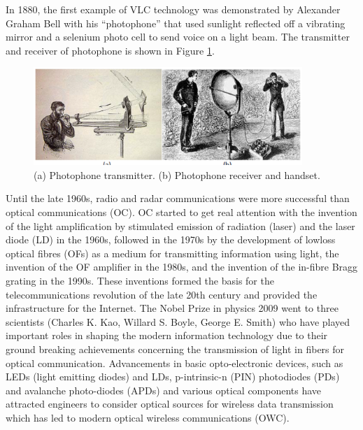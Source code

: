 In 1880, the first example of VLC technology was demonstrated by Alexander Graham Bell with his “photophone” that used sunlight
reflected off a vibrating mirror and a selenium photo cell to send voice on a light beam. The transmitter and receiver of photophone is shown in Figure \ref{sun}.
\begin{figure}[h]
\begin{center}
\includegraphics[width=4.0in]{sunlight.eps}
\caption{(a) Photophone transmitter. (b) Photophone receiver and handset.} \label{sun}
\end{center}
\end{figure}

Until the late 1960s, radio and radar communications were more successful than optical communications
(OC). OC started to get real attention with the invention of the light amplification by stimulated emission of
radiation (laser) and the laser diode (LD) in the 1960s, followed in the 1970s by the development of lowloss
optical fibres (OFs) as a medium for transmitting information using light, the invention of the OF amplifier in the 1980s, and the invention of the in-fibre Bragg grating in the 1990s. These inventions formed the basis for the telecommunications revolution of the late 20th century and provided the infrastructure for the Internet. The Nobel Prize in physics 2009 went to three scientists (Charles K. Kao, Willard S. Boyle,
George E. Smith) who have played important roles in shaping the modern information technology due to
their ground breaking achievements concerning the transmission of light in fibers for optical
communication. Advancements in basic opto-electronic devices, such as LEDs (light emitting diodes) and
LDs, p-intrinsic-n (PIN) photodiodes (PDs) and avalanche photo-diodes (APDs) and various optical
components have attracted engineers to consider optical sources for wireless data transmission which has
led to modern optical wireless communications (OWC).

